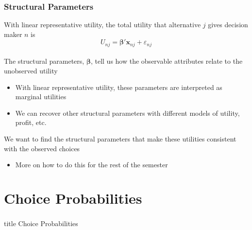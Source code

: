 \documentclass{beamer}\usepackage[]{graphicx}\usepackage[]{xcolor}
\begin{document}
\begin{frame}\frametitle{Structural Parameters}
  With linear representative utility, the total utility that alternative $j$ gives decision maker $n$ is
  $$U_{nj} = \bm{\beta}' \bm{x}_{nj} + \varepsilon_{nj}$$ \\
  \vspace{2ex}
  The structural parameters, $\bm{\beta}$, tell us how the observable attributes relate to the unobserved utility
  \begin{itemize}
    \item With linear representative utility, these parameters are interpreted as marginal utilities
    \item We can recover other structural parameters with different models of utility, profit, etc.
  \end{itemize}
  \vspace{2ex}
  We want to find the structural parameters that make these utilities consistent with the observed choices
  \begin{itemize}
    \item More on how to do this for the rest of the semester
  \end{itemize}
\end{frame}

\section{Choice Probabilities}
\label{probabilities}
\begin{frame}\frametitle{}
    \vfill
    \centering
    \begin{beamercolorbox}[center]{title}
        \Large Choice Probabilities
    \end{beamercolorbox}
    \vfill
\end{frame}
\end{document}
